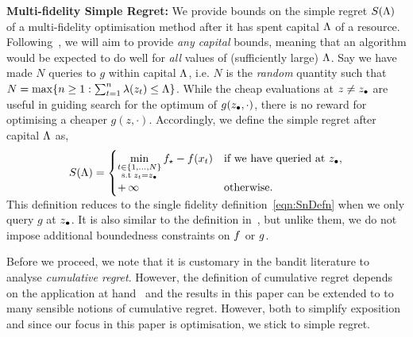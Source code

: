 \textbf{Multi-fidelity Simple Regret:}
We provide bounds on the simple regret $S(\Lambda)$ of a multi-fidelity optimisation method
after it has spent capital $\Lambda$ of a resource.
Following~\citet{srinivas10gpbandits}, we
will aim to provide \emph{any capital} bounds, meaning that an algorithm would be expected
to do well for \emph{all} values of (sufficiently large) $\Lambda$.
Say we have made $N$ queries to $g$ within capital $\Lambda$,
i.e. $N$ is the \emph{random} quantity such that
$N = \max\{n\geq 1: \sum_{t=1}^n \lambda(z_t) \leq \Lambda\}$.
While the cheap evaluations at $z\neq z_{\bullet}$ are useful in guiding search 
for the optimum of $g(z_{\bullet},\cdot)$, there is no reward for optimising a cheaper
$g(z,\cdot)$.
Accordingly, we define the simple regret after capital $\Lambda$ as,
\vspace{-0.02in}
\begin{align*}
S(\capital) =
\begin{cases}
\displaystyle\min_{\substack{t\in\{1,\dots,N\}\\\text{s.t}\;\zt = \zhf}}
  \funcopt - \func(\xt) %
    &\text{if we have queried at $\zhf$,} \\
+\,\infty & \text{otherwise.}
\end{cases}
\\[-0.15in]
\end{align*}
\vspace{-0.35in}

This definition reduces to the single fidelity definition~\eqref{eqn:SnDefn} when we only
query $g$ at $z_{\bullet}$.
It is also similar to the definition in~\citet{kandasamy16mfbo}, but unlike them, we do
not impose additional boundedness constraints on $f$ or $g$.

Before we proceed, we note that it is customary in the bandit literature to analyse
\emph{cumulative regret}. However, the definition of cumulative regret depends
on the
application at hand~\citep{kandasamy16mfbandit} and the results in this paper can be
extended to to many sensible notions of cumulative regret.
However, both to simplify exposition and since our focus in this paper is optimisation,
we stick to simple regret.

